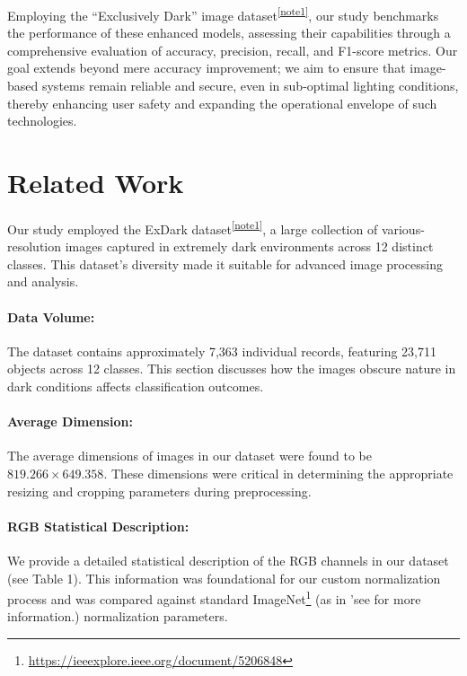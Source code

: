 \documentclass{article} %
\begin{document}
Employing the ``Exclusively Dark'' image dataset\textsuperscript{\ref{note1}}, our study benchmarks the performance of these enhanced models, assessing their capabilities through a comprehensive evaluation of accuracy, precision, recall, and F1-score metrics. Our goal extends beyond mere accuracy improvement; we aim to ensure that image-based systems remain reliable and secure, even in sub-optimal lighting conditions, thereby enhancing user safety and expanding the operational envelope of such technologies.

\section{Related Work}
Our study employed the ExDark dataset\textsuperscript{\ref{note1}}, a large collection of various-resolution images captured in extremely dark environments across 12 distinct classes. This dataset's diversity made it suitable for advanced image processing and analysis.


\paragraph{Data Volume:} The dataset contains approximately 7,363 individual records, featuring 23,711 objects across 12 classes. This section discusses how the images obscure nature in dark conditions affects classification outcomes.


\paragraph{Average Dimension:} The average dimensions of images in our dataset were found to be \(819.266 \times 649.358\). These dimensions were critical in determining the appropriate resizing and cropping parameters during preprocessing.


\paragraph{RGB Statistical Description:} We provide a detailed statistical description of the RGB channels in our dataset (see Table 1). This information was foundational for our custom normalization process and was compared against standard ImageNet\footnote{\label{note4}\url{https://ieeexplore.ieee.org/document/5206848}} (as in 'see \citet{ImageNet} for more information.) normalization parameters.
\end{document}
